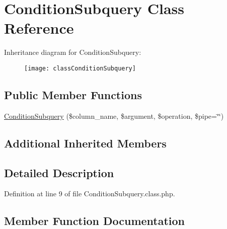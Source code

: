 \hypertarget{classConditionSubquery}{}\section{Condition\+Subquery Class Reference}
\label{classConditionSubquery}
Inheritance diagram for Condition\+Subquery\+:\begin{figure}[H]
\begin{center}
\leavevmode
\texttt{[image: classConditionSubquery]}
\end{center}
\end{figure}
\subsection*{Public Member Functions}
\begin{DoxyCompactItemize}
\item 
\hyperlink{classConditionSubquery_a5dd42cd7316837c2b63fe9b6d5703958}{Condition\+Subquery} (\$column\+\_\+name, \$argument, \$operation, \$pipe=\char`\"{}\char`\"{})
\end{DoxyCompactItemize}
\subsection*{Additional Inherited Members}


\subsection{Detailed Description}


Definition at line 9 of file Condition\+Subquery.\+class.\+php.



\subsection{Member Function Documentation}
